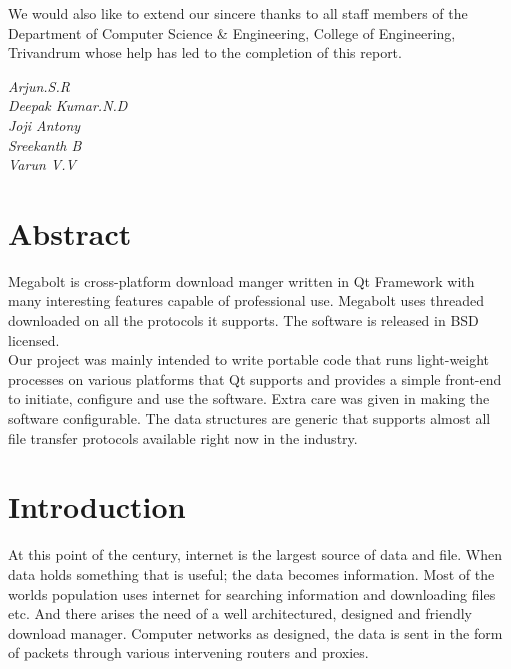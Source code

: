 \documentclass[pdftex,12pt,a4paper,pdfencoding=unicode]{article}
\begin{document}
\begin{onehalfspace}
      \indent We would also like to extend our sincere thanks to all staff members of the Department of Computer Science \&
      Engineering, College of Engineering, Trivandrum whose help has led to the completion of this report.\\[1cm]
      \begin{minipage}{0.4\textwidth}
        \begin{flushleft}
          {
          }
        \end{flushleft}
      \end{minipage}
      \begin{minipage}{0.4\textwidth}
        \begin{flushright}
          {
            \emph{Arjun.S.R\\Deepak Kumar.N.D\\ Joji Antony\\ Sreekanth B\\ Varun V.V\\}
          }
        \end{flushright}
      \end{minipage}
      \vfill
      \newpage

      \section*{\Large Abstract}
      \thispagestyle{plain}
      Megabolt is cross-platform download manger written in Qt Framework with many interesting features
      capable of professional use. Megabolt uses threaded downloaded on all the protocols it supports.
      The software is released in BSD licensed.\\

      Our project was mainly intended to write portable code that runs light-weight processes on various
      platforms that Qt supports and provides a simple front-end to initiate, configure and use the software.
      Extra care was given in making the software configurable. The data structures are generic that supports
      almost all file transfer protocols available right now in the industry.

      \newpage
      \begingroup
      \hypersetup{linkcolor=blue}
      \tableofcontents
      \endgroup
      \thispagestyle{empty}
      \newpage
      \listoffigures
      \thispagestyle{empty}
      \newpage
      \pagestyle{fancy}
      \fancyhead[R]{\leftmark}
      \fancyhead[L]{\rightmark}
      \fancyfoot[C]{\thepage}
      \section{Introduction}
      \setcounter{page}{1}
      At this point of the century, internet is the largest source of data and file. When data holds something that is useful; the
      data becomes information. Most of the worlds population uses internet for searching information and downloading files etc.
      And there arises the need of a well architectured, designed and friendly download manager. Computer networks as designed,
      the data is sent in the form of packets through various intervening routers and proxies.


\end{onehalfspace}
\end{document}
